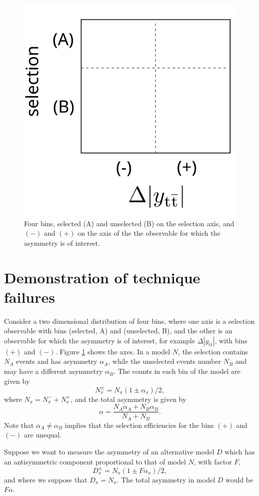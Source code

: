 \documentclass[letterpaper,11pt]{article}
\begin{document}
\begin{figure}
  \centering
  \includegraphics[width=0.3\linewidth]{axes}
  \caption{\label{axes} Four bins, selected (A) and unselected (B) on
    the selection axis, and $(-)$ and $(+)$ on the axis of the the
    observable for which the asymmetry is of interest.}
\end{figure}

\section{Demonstration of technique failures}

Consider a two dimensional distribution of four bins, where one axis
is a selection observable with bins (selected, A) and (unselected, B),
and the other is an observable for which the asymmetry is of interest,
for example $\Delta|y_{\mathrm{t\bar{t}}}|$, with bins $(+)$ and
$(-)$.  Figure \ref{axes} shows the axes. In a model $N$, the
selection contains $N_A$ events and has asymmetry $\alpha_A$, while
the unselected events number $N_B$ and may have a different asymmetry
$\alpha_B$.  The counts in each bin of the model are given by
\[N_x^{\pm} = N_x(1\pm\alpha_x)/2,\]
where $N_x=N_x^-+N_x^+$, and the total asymmetry is given by
\[\alpha = \frac{N_A\alpha_A + N_B\alpha_B}{N_A+N_B}.\]
Note that $\alpha_A\ne\alpha_B$ implies that the selection
efficiencies for the bins $(+)$ and $(-)$ are unequal.

Suppose we want to measure the asymmetry of an alternative model $D$
which has an antisymmetric component proportional to that of model
$N$, with factor $F$,
\[D_x^{\pm} = N_x(1\pm F\alpha_x)/2,\]
and where we suppose that $D_x=N_x$.  The total asymmetry in model $D$
would be $F\alpha$.
\end{document}
